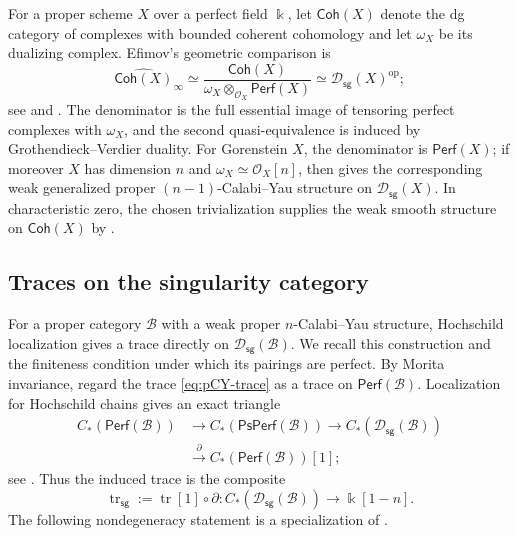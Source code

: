 \documentclass[11pt,letterpaper,reqno]{amsart}
\theoremstyle{plain}
\theoremstyle{definition}
\theoremstyle{plain}
\theoremstyle{definition}
\numberwithin{equation}{section}
\begin{document}
For a proper scheme $X$ over a perfect field $\Bbbk$, let $\mathsf{Coh}(X)$ denote the dg category of complexes with bounded coherent cohomology and let $\omega_X$ be its dualizing complex.
Efimov's geometric comparison is
\begin{equation}\label{eq:scheme-boundary-comparison}
\widehat{\mathsf{Coh}(X)}_{\infty}
\simeq
\frac{\mathsf{Coh}(X)}{\omega_X\otimes_{\mathcal O_X} \mathsf{Perf}(X)}
\simeq\mathscr D_{\mathsf{sg}}(X)^{\mathrm{op}};
\end{equation}
see \cite[Theorem 9.2 and Proposition B.1]{Efimov2017} and \cite[Section 4]{Gao2025}.
The denominator is the full essential image of tensoring perfect complexes with $\omega_X$, and the second quasi-equivalence is induced by Grothendieck--Verdier duality.
For Gorenstein $X$, the denominator is $\mathsf{Perf}(X)$; if moreover $X$ has dimension $n$ and $\omega_X\simeq\mathcal O_X[n]$, then \cite[Theorem 1.6]{Gao2025} gives the corresponding weak generalized proper $(n-1)$-Calabi--Yau structure on $\mathscr D_{\mathsf{sg}}(X)$.
In characteristic zero, the chosen trivialization supplies the weak smooth structure on $\mathsf{Coh}(X)$ by \cite[Section 5.2 and Proposition 5.12]{Brav-Dyckerhoff2019}.

\subsection{Traces on the singularity category}\label{subsec:singularity-traces}

For a proper category $\mathscr B$ with a weak proper $n$-Calabi--Yau structure, Hochschild localization gives a trace directly on $\mathscr D_{\mathsf{sg}}(\mathscr B)$.
We recall this construction and the finiteness condition under which its pairings are perfect.
By Morita invariance, regard the trace \eqref{eq:pCY-trace} as a trace on $\mathsf{Perf}(\mathscr B)$.
Localization for Hochschild chains gives an exact triangle
\begin{equation}\label{eq:singularity-Hochschild-triangle}
\begin{aligned}
C_*(\mathsf{Perf}(\mathscr B))&\longrightarrow C_*(\mathsf{PsPerf}(\mathscr B))
\longrightarrow C_*(\mathscr D_{\mathsf{sg}}(\mathscr B))\\
&\xrightarrow{\;\partial\;}C_*(\mathsf{Perf}(\mathscr B))[1];
\end{aligned}
\end{equation}
see \cite[Theorem 5.2(a)]{Keller2006b}.
Thus the induced trace is the composite
\begin{equation}\label{eq:singularity-trace}
\operatorname{tr}_{\mathsf{sg}}
:=\operatorname{tr}[1]\circ\partial:
C_*(\mathscr D_{\mathsf{sg}}(\mathscr B))\longrightarrow\Bbbk[1-n].
\end{equation}
The following nondegeneracy statement is a specialization of \cite[Theorem 4.3.1(b)]{Hanihara-Liu2026}.
\end{document}
